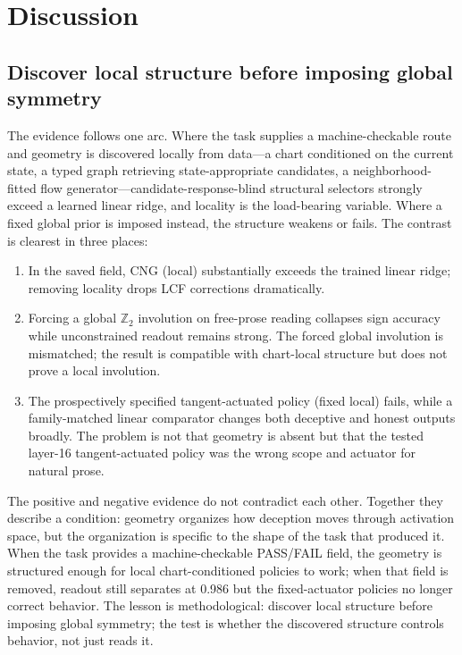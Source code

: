 \section{Discussion}

\subsection{Discover local structure before imposing global symmetry}

The evidence follows one arc. Where the task supplies a machine-checkable route and geometry is
discovered locally from data---a chart conditioned on the current state, a typed graph
retrieving state-appropriate candidates, a neighborhood-fitted flow
generator---candidate-response-blind structural selectors strongly exceed a learned linear
ridge, and locality is the load-bearing variable. Where a fixed global prior is imposed
instead, the structure weakens or fails. The contrast is clearest in three places:

\begin{enumerate}
    \item In the saved field, CNG (local) substantially exceeds the trained linear ridge;
          removing locality drops LCF corrections dramatically.
    \item Forcing a global $\mathbb{Z}_2$ involution on free-prose reading collapses sign
          accuracy while unconstrained readout remains strong. The forced global involution is
          mismatched; the result is compatible with chart-local structure but does not prove a
          local involution.
    \item The prospectively specified tangent-actuated policy (fixed local) fails, while a
          family-matched linear comparator changes both deceptive and honest outputs broadly. The
          problem is not that geometry is absent but that the tested layer-16 tangent-actuated
          policy was the wrong scope and actuator for natural prose.
\end{enumerate}

The positive and negative evidence do not contradict each other. Together they describe a
condition: geometry organizes how deception moves through activation space, but the
organization is specific to the shape of the task that produced it. When the task provides a
machine-checkable PASS/FAIL field, the geometry is structured enough for local
chart-conditioned policies to work; when that field is removed, readout still separates at
0.986 but the fixed-actuator policies no longer correct behavior. The lesson is methodological:
discover local structure before imposing global symmetry; the test is whether the discovered
structure controls behavior, not just reads it.

